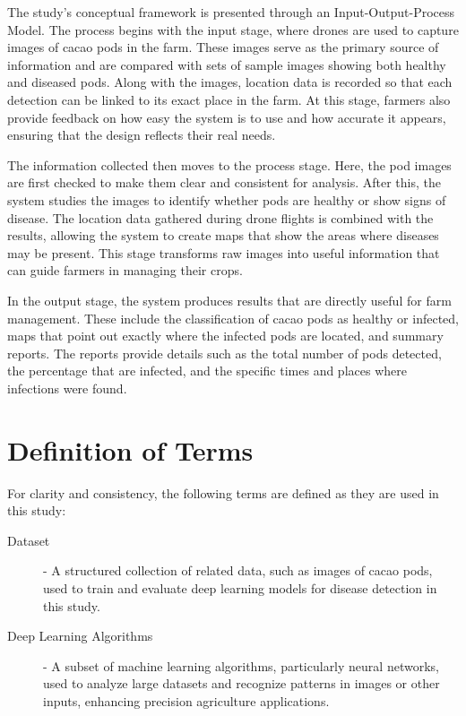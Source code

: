 {The study's conceptual framework is presented through an Input-Output-Process Model. The process begins with the input stage, where drones are used to capture images of cacao pods in the farm. These images serve as the primary source of information and are compared with sets of sample images showing both healthy and diseased pods. Along with the images, location data is recorded so that each detection can be linked to its exact place in the farm. At this stage, farmers also provide feedback on how easy the system is to use and how accurate it appears, ensuring that the design reflects their real needs.

The information collected then moves to the process stage. Here, the pod images are first checked to make them clear and consistent for analysis. After this, the system studies the images to identify whether pods are healthy or show signs of disease. The location data gathered during drone flights is combined with the results, allowing the system to create maps that show the areas where diseases may be present. This stage transforms raw images into useful information that can guide farmers in managing their crops.

In the output stage, the system produces results that are directly useful for farm management. These include the classification of cacao pods as healthy or infected, maps that point out exactly where the infected pods are located, and summary reports. The reports provide details such as the total number of pods detected, the percentage that are infected, and the specific times and places where infections were found.


\section{Definition of Terms}

For clarity and consistency, the following terms are defined as they are used in this study:

\begin{description}
	\item[Dataset] - A structured collection of related data, such as images of cacao pods, used to train and evaluate deep learning models for disease detection in this study.

	\item[Deep Learning Algorithms] - A subset of machine learning algorithms, particularly neural networks, used to analyze large datasets and recognize patterns in images or other inputs, enhancing precision agriculture applications.


\end{description}}
